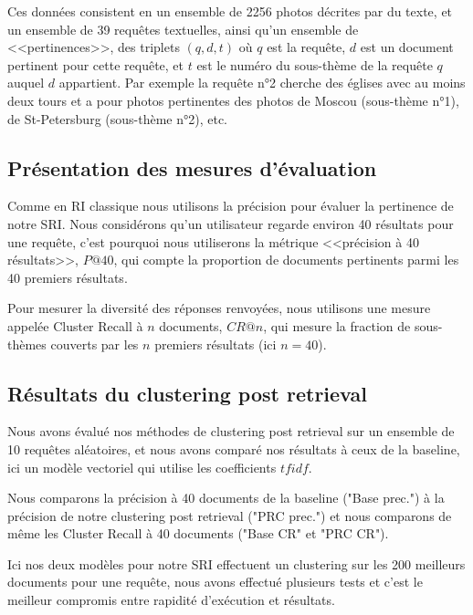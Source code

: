 \documentclass{article}
\begin{document}
Ces données consistent en un ensemble de 2256 photos décrites par du texte, et un ensemble de 39 requêtes textuelles, ainsi qu'un ensemble de <<pertinences>>, des triplets $(q,d,t)$ où $q$ est la requête, $d$ est un document pertinent pour cette requête, et $t$ est le numéro du sous-thème de la requête $q$ auquel $d$ appartient.
Par exemple la requête n°2 cherche des églises avec au moins deux tours et a pour photos pertinentes des photos de Moscou (sous-thème n°1), de St-Petersburg (sous-thème n°2), etc.

\subsection{Présentation des mesures d'évaluation}
Comme en RI classique nous utilisons la précision pour évaluer la pertinence de notre SRI. Nous considérons qu'un utilisateur regarde environ 40 résultats pour une requête, c'est pourquoi nous utiliserons la métrique <<précision à 40 résultats>>, $P@40$, qui compte la proportion de documents pertinents parmi les 40 premiers résultats.

Pour mesurer la diversité des réponses renvoyées, nous utilisons une mesure appelée Cluster Recall à $n$ documents, $CR@n$, qui mesure la fraction de sous-thèmes couverts par les $n$ premiers résultats (ici $n=40$).


\subsection{Résultats du clustering post retrieval}
Nous avons évalué nos méthodes de clustering post retrieval sur un ensemble de 10 requêtes aléatoires, et nous avons comparé nos résultats à ceux de la baseline, ici un modèle vectoriel qui utilise les coefficients $tfidf$.

Nous comparons la précision à 40 documents de la baseline ("Base prec.") à la précision de notre clustering post retrieval ("PRC prec.") et nous comparons de même les Cluster Recall à 40 documents ("Base CR" et "PRC CR").

Ici nos deux modèles pour notre SRI effectuent un clustering sur les 200 meilleurs documents pour une requête, nous avons effectué plusieurs tests et c'est le meilleur compromis entre rapidité d'exécution et résultats.
\end{document}
